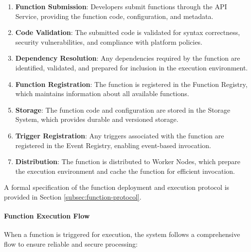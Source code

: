 \documentclass{article}
\begin{document}
\begin{enumerate}
    \item \textbf{Function Submission}: Developers submit functions through the API Service, providing the function code, configuration, and metadata.
    
    \item \textbf{Code Validation}: The submitted code is validated for syntax correctness, security vulnerabilities, and compliance with platform policies.
    
    \item \textbf{Dependency Resolution}: Any dependencies required by the function are identified, validated, and prepared for inclusion in the execution environment.
    
    \item \textbf{Function Registration}: The function is registered in the Function Registry, which maintains information about all available functions.
    
    \item \textbf{Storage}: The function code and configuration are stored in the Storage System, which provides durable and versioned storage.
    
    \item \textbf{Trigger Registration}: Any triggers associated with the function are registered in the Event Registry, enabling event-based invocation.
    
    \item \textbf{Distribution}: The function is distributed to Worker Nodes, which prepare the execution environment and cache the function for efficient invocation.
\end{enumerate}

A formal specification of the function deployment and execution protocol is provided in Section \ref{subsec:function-protocol}.





\paragraph{Function Execution Flow}
When a function is triggered for execution, the system follows a comprehensive flow to ensure reliable and secure processing:
\end{document}
